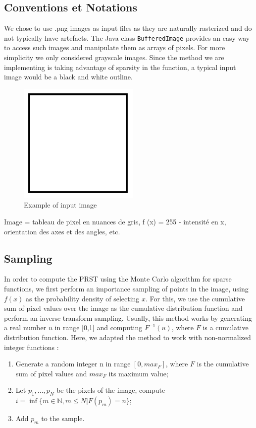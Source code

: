 \documentclass[10pt,a4paper]{article}			%
\begin{document}
	\subsection {Conventions et Notations}
We chose to use .png images as input files as they are naturally rasterized and do not typically have artefacts. The Java class \texttt{BufferedImage} provides an easy way to access such images and manipulate them as arrays of pixels. For more simplicity we only considered grayscale images. Since the method we are implementing is taking advantage of sparsity in the function, a typical input image would be a black and white outline.
\begin{figure}[h]
\includegraphics[scale=0.5]{img/carre.png}
\caption{Example of input image}
\label{exemple_carre}
\end{figure}

Image = tableau de pixel en nuances de gris, f (x) = 255 - intensité en x, orientation des axes et des angles, etc.

	\subsection{Sampling}
In order to compute the PRST using the Monte Carlo algorithm for sparse functions, we first perform an importance sampling of points in the image, using $f(x)$  as the probability density of selecting $x$. For this, we use the cumulative sum of pixel values over the image as the cumulative distribution function and perform an inverse transform sampling. Usually, this method works by generating a real number $u$ in range [0,1] and computing $F^{-1}(u)$, where $F$ is a cumulative distribution function. Here, we adapted the method to work with non-normalized integer functions :
\begin{enumerate}
\item Generate a random integer n in range $[0,max_F]$, where $F$ is the cumulative sum of pixel values and $max_F$ its maximum value;
\item Let $p_1,...,p_N$ be the pixels of the image, compute $i=\inf\{m\in \mathbb{N}, m\leq N |  F(p_m) = n\}$;
\item Add $p_m$ to the sample.
\end{enumerate}
\end{document}
